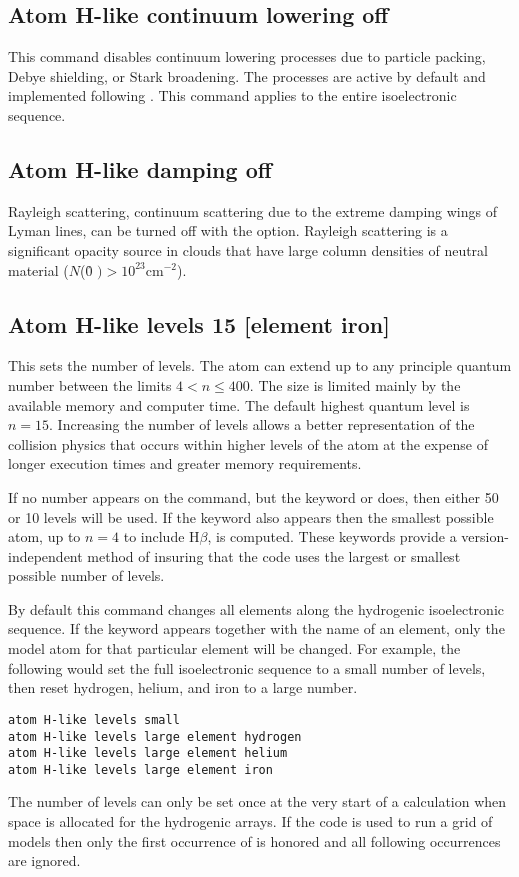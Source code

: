 \subsection{Atom H-like continuum lowering off  }
This command disables continuum lowering processes due to particle packing,
Debye shielding, or Stark broadening.  The processes are active by default
and implemented following \citet{Bautista00}.  This command applies
to the entire isoelectronic sequence.

\subsection{Atom H-like damping off  }

Rayleigh scattering, continuum scattering due to the extreme damping
wings of Lyman lines, can be turned off with the  option.
Rayleigh scattering is a significant opacity source in clouds that have
large column densities of neutral material
($N$(\h0 $) > 10^{23} \mathrm{cm}^{-2}$).

\subsection{Atom H-like levels 15 [element iron]}

This sets the number of levels.
The atom can extend up to any principle
quantum number between the limits $4 < n \le 400$.
The size is limited mainly
by the available memory and computer time.
The default highest quantum level is $n = 15$.
Increasing the
number of levels allows a better representation of the collision physics
that occurs within higher levels of the atom at the expense of longer
execution times and greater memory requirements.

If no number appears on the  command,
but the keyword
 or  does,
then either 50 or 10 levels will be used.
If the
keyword  also appears then
the smallest possible atom,
up to $n = 4$ to include H$\beta$, is computed.
These keywords provide a version-independent
method of insuring that the code uses the largest or smallest possible
number of levels.

By default this command changes all elements along the hydrogenic
isoelectronic sequence.
If the keyword  appears together with the
name of an element, only the model atom for that particular element will
be changed.
For example, the following would set the full isoelectronic
sequence to a small number of levels, then reset hydrogen, helium,
and iron to a large number.
\begin{verbatim}
atom H-like levels small
atom H-like levels large element hydrogen
atom H-like levels large element helium
atom H-like levels large element iron
\end{verbatim}
The number of levels can only be set once at the very start of a
calculation when space is allocated for the hydrogenic arrays.
If the code
is used to run a grid of models then only the first occurrence of
 is honored and all following occurrences
are ignored.

